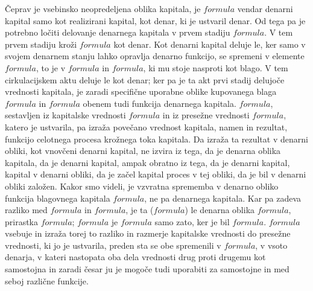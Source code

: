 \documentclass[kapital_02.tex]{subfiles}
\begin{document}
Čeprav je vsebinsko neopredeljena oblika kapitala, je \( formula \) vendar denarni kapital samo kot realizirani kapital, kot denar, ki je ustvaril denar. Od tega pa je potrebno ločiti delovanje denarnega kapitala v prvem stadiju \( formula \). V tem prvem stadiju kroži \( formula \) kot denar. Kot denarni kapital deluje le, ker samo v svojem denarnem stanju lahko opravlja denarno funkcijo, se spremeni v elemente \( formula \), to je v \( formula \) in \( formula \), ki mu stoje nasproti kot blago. V tem cirkulacijskem aktu deluje le kot denar; ker pa je ta akt prvi stadij delujoče vrednosti kapitala, je zaradi specifične uporabne oblike kupovanega blaga \( formula \) in \( formula \) obenem tudi funkcija denarnega kapitala. \( formula \), sestavljen iz kapitalske vrednosti \( formula \) in iz presežne vrednosti \( formula \), katero je ustvarila, pa izraža povečano vrednost kapitala, namen in rezultat, funkcijo celotnega procesa krožnega toka kapitala. Da izraža ta rezultat v denarni obliki, kot vnovčeni denarni kapital, ne izvira iz tega, da je denarna oblika kapitala, da je denarni kapital, ampak obratno iz tega, da je denarni kapital, kapital v denarni obliki, da je začel kapital proces v tej obliki, da je bil v denarni obliki založen. Kakor smo videli, je vzvratna sprememba v denarno obliko funkcija blagovnega kapitala \( formula \), ne pa denarnega kapitala. Kar pa zadeva razliko med \( formula \) in \( formula \), je ta (\( formula \)) le denarna oblika \( formula \), prirastka \( formula \); \( formula \) je \( formula \) samo zato, ker je bil \( formula \). \( formula \) vsebuje in izraža torej to razliko in razmerje kapitalske vrednosti do presežne vrednosti, ki jo je ustvarila, preden sta se obe spremenili v \( formula \), v vsoto denarja, v kateri nastopata oba dela vrednosti drug proti drugemu kot samostojna in zaradi česar ju je mogoče tudi uporabiti za samostojne in med seboj različne funkcije.
\end{document}
